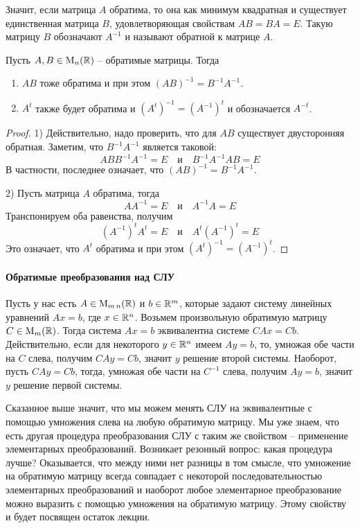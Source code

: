 Значит, если матрица $A$ обратима, то она как минимум квадратная и существует единственная матрица $B$, удовлетворяющая свойствам $AB = BA = E$.
Такую матрицу $B$ обозначают $A^{-1}$ и называют обратной к матрице $A$.

\begin{claim}
\label{claim::ProdTranspInv}
Пусть $A, B\in \operatorname{M}_{n}(\mathbb R)$ -- обратимые матрицы.
Тогда 
\begin{enumerate}
\item $AB$ тоже обратима и при этом $(AB)^{-1} = B^{-1}A^{-1}$.

\item  $A^t$ также будет обратима и $(A^t)^{-1} = (A^{-1})^t$ и обозначается $A^{-t}$.
\end{enumerate}
\end{claim}
\begin{proof}
1) Действительно, надо проверить, что для $AB$ существует двусторонняя обратная.
Заметим, что $B^{-1}A^{-1}$ является таковой:
\[
AB B^{-1}A^{-1} = E \quad\text{и}\quad B^{-1}A^{-1} AB = E
\]
В частности, последнее означает, что $(AB)^{-1} = B^{-1}A^{-1}$.

2) Пусть матрица $A$ обратима, тогда
\[
A A^{-1} = E\quad \text{и}\quad A^{-1}A = E
\]
Транспонируем оба равенства, получим
\[
(A^{-1})^t A^t = E\quad \text{и}\quad A^t (A^{-1})^t = E
\]
Это означает, что $A^t$ обратима и при этом $(A^t)^{-1} = (A^{-1})^t$.
\end{proof}

\paragraph{Обратимые преобразования над СЛУ} 


Пусть у нас есть $A\in\operatorname{M}_{m\,n}(\mathbb R)$ и $b\in \mathbb R^{m}$, которые задают систему линейных уравнений $Ax = b$, где $x\in \mathbb R^{n}$.
Возьмем произвольную обратимую матрицу $C\in\operatorname{M}_{m}(\mathbb R)$.
Тогда система $Ax = b$ эквивалентна системе $CAx = Cb$.
Действительно, если для некоторого $y\in\mathbb R^{n}$ имеем $Ay = b$, то, умножая обе части на $C$ слева, получим $CAy = Cb$, значит $y$ решение второй системы.
Наоборот, пусть $CA y = Cb$, тогда, умножая обе части на $C^{-1}$ слева, получим $Ay =b$, значит $y$ решение первой системы.

Сказанное выше значит, что мы можем менять СЛУ на эквивалентные с помощью умножения слева на любую обратимую матрицу.
Мы уже знаем, что есть другая процедура преобразования СЛУ с таким же свойством -- применение элементарных преобразований.
Возникает резонный вопрос: какая процедура лучше?
Оказывается, что между ними нет разницы в том смысле, что умножение на обратимую матрицу всегда совпадает с некоторой последовательностью элементарных преобразований и наоборот любое элементарное преобразование можно выразить с помощью умножения на обратимую матрицу.
Этому свойству и будет посвящен остаток лекции.

